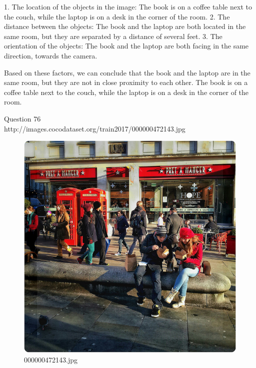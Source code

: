 \begin{enumerate}
    1. The location of the objects in the image: The book is on a coffee table next to the couch, while the laptop is on a desk in the corner of the room.
    2. The distance between the objects: The book and the laptop are both located in the same room, but they are separated by a distance of several feet.
    3. The orientation of the objects: The book and the laptop are both facing in the same direction, towards the camera.
    
    Based on these factors, we can conclude that the book and the laptop are in the same room, but they are not in close proximity to each other. The book is on a coffee table next to the couch, while the laptop is on a desk in the corner of the room.
\end{enumerate}
Question 76\\
http://images.cocodataset.org/train2017/000000472143.jpg
\begin{figure}[h]
    \centering
    \includegraphics[width=0.8\linewidth]{../image set/hard/000000472143.jpg}
    \caption{000000472143.jpg}
\end{figure}
